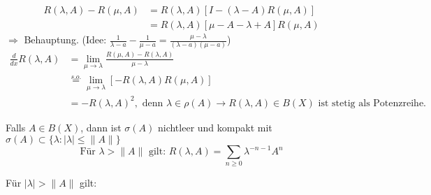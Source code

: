 \begin{beweis}
	\begin{align*}
		R( \lambda, A) - R( \mu, A) & = R( \lambda, A) \left[ I - (\lambda - A) R(\mu, A) \right]	\\
			& = R( \lambda, A) \left[ \mu - A - \lambda + A \right] R(\mu, A)
	\end{align*}
	$\Rightarrow$ Behauptung. (Idee: $\frac{1}{\lambda - a} - \frac{1}{\mu - a} = \frac{\mu - \lambda}{(\lambda - a)(\mu - a)}$)
	\begin{align*}
		\frac{d}{dx} R(\lambda, A) & = \lim_{\mu \rightarrow \lambda} \frac{R(\mu, A) - R(\lambda, A)}{\mu - \lambda} \\
				& \overset{s.o.}{=} \lim_{\mu \rightarrow \lambda} \left[ - R( \lambda, A) R(\mu, A) \right] \\
				& = - R(\lambda, A)^{2}, \text{ denn } \lambda \in \rho(A) \rightarrow R(\lambda, A) \in B(X) \text{ ist stetig als Potenzreihe.} 		
	\end{align*}
\end{beweis}


\begin{satz}
	Falls $A \in B(X)$, dann ist $\sigma(A)$ nichtleer und kompakt mit $\sigma(A) \subset \{ \lambda : |\lambda| \leq \| A \| \}$ \\
	\[ \text{Für } \lambda > \| A \| \text{ gilt: } R(\lambda, A) = \sum_{n \geq 0} \lambda^{-n-1} A^{n} \]
\end{satz}

\begin{beweis}
	Für $| \lambda | > \| A \|$ gilt:
\end{beweis}



\newpage